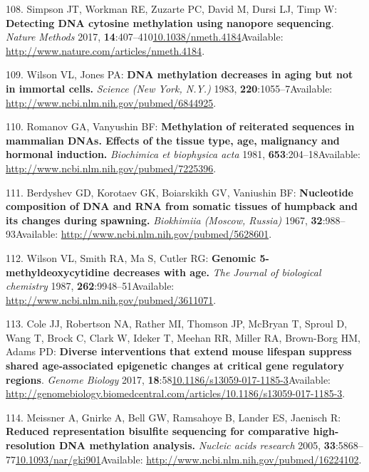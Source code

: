 \documentclass[
]{book}
\begin{document}
\leavevmode\hypertarget{ref-Simpson2017}{}%
108. Simpson JT, Workman RE, Zuzarte PC, David M, Dursi LJ, Timp W: \textbf{Detecting DNA cytosine methylation using nanopore sequencing}. \emph{Nature Methods} 2017, \textbf{14}:407--410\href{https://doi.org/10.1038/nmeth.4184}{10.1038/nmeth.4184}Available: \url{http://www.nature.com/articles/nmeth.4184}.

\leavevmode\hypertarget{ref-Wilson1983}{}%
109. Wilson VL, Jones PA: \textbf{DNA methylation decreases in aging but not in immortal cells.} \emph{Science (New York, N.Y.)} 1983, \textbf{220}:1055--7Available: \url{http://www.ncbi.nlm.nih.gov/pubmed/6844925}.

\leavevmode\hypertarget{ref-Romanov1981}{}%
110. Romanov GA, Vanyushin BF: \textbf{Methylation of reiterated sequences in mammalian DNAs. Effects of the tissue type, age, malignancy and hormonal induction.} \emph{Biochimica et biophysica acta} 1981, \textbf{653}:204--18Available: \url{http://www.ncbi.nlm.nih.gov/pubmed/7225396}.

\leavevmode\hypertarget{ref-Berdyshev1967}{}%
111. Berdyshev GD, Korotaev GK, Boiarskikh GV, Vaniushin BF: \textbf{Nucleotide composition of DNA and RNA from somatic tissues of humpback and its changes during spawning.} \emph{Biokhimiia (Moscow, Russia)} 1967, \textbf{32}:988--93Available: \url{http://www.ncbi.nlm.nih.gov/pubmed/5628601}.

\leavevmode\hypertarget{ref-Wilson1987}{}%
112. Wilson VL, Smith RA, Ma S, Cutler RG: \textbf{Genomic 5-methyldeoxycytidine decreases with age.} \emph{The Journal of biological chemistry} 1987, \textbf{262}:9948--51Available: \url{http://www.ncbi.nlm.nih.gov/pubmed/3611071}.

\leavevmode\hypertarget{ref-Cole2017}{}%
113. Cole JJ, Robertson NA, Rather MI, Thomson JP, McBryan T, Sproul D, Wang T, Brock C, Clark W, Ideker T, Meehan RR, Miller RA, Brown-Borg HM, Adams PD: \textbf{Diverse interventions that extend mouse lifespan suppress shared age-associated epigenetic changes at critical gene regulatory regions}. \emph{Genome Biology} 2017, \textbf{18}:58\href{https://doi.org/10.1186/s13059-017-1185-3}{10.1186/s13059-017-1185-3}Available: \url{http://genomebiology.biomedcentral.com/articles/10.1186/s13059-017-1185-3}.

\leavevmode\hypertarget{ref-Meissner2005}{}%
114. Meissner A, Gnirke A, Bell GW, Ramsahoye B, Lander ES, Jaenisch R: \textbf{Reduced representation bisulfite sequencing for comparative high-resolution DNA methylation analysis.} \emph{Nucleic acids research} 2005, \textbf{33}:5868--77\href{https://doi.org/10.1093/nar/gki901}{10.1093/nar/gki901}Available: \url{http://www.ncbi.nlm.nih.gov/pubmed/16224102}.
\end{document}
